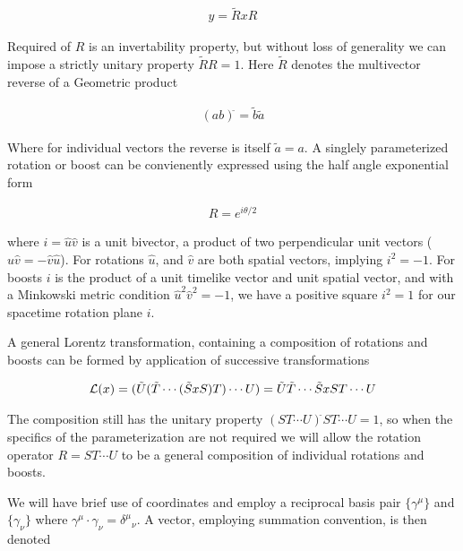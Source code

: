 \begin{align}\label{eqn:rotationGen:foo1}
y = \tilde{R} x R
\end{align}

Required of $R$ is an invertability property, but without loss of generality we can impose a strictly unitary property $\tilde{R} R = 1$.  Here $\tilde{R}$ denotes the multivector reverse of a Geometric product

\begin{align}\label{eqn:rotationGen:foo2}
(a b)^{\tilde{}} = \tilde{b} \tilde{a}
\end{align}

Where for individual vectors the reverse is itself $\tilde{a} = a$.  A singlely parameterized rotation or boost can be convienently expressed using the half angle exponential form

\begin{align}\label{eqn:rotationGen:foo3}
R = e^{i \theta/2}
\end{align}

where $i = \hat{u}\hat{v}$ is a unit bivector, a product of two perpendicular unit vectors ($\hat{u} \hat{v} = - \hat{v} \hat{u}$).  For rotations $\hat{u}$, and $\hat{v}$ are both spatial vectors, implying $i^2 = -1$.  For boosts $i$ is the product of a unit timelike vector and unit spatial vector, and with a Minkowski metric condition $\hat{u}^2 \hat{v}^2 = -1$, we have a positive square $i^2 = 1$ for our spacetime rotation plane $i$.

A general Lorentz transformation, containing a composition of rotations and boosts can be formed by application of successive transformations 

\begin{align}\label{eqn:rotationGen:foo4}
\mathcal{L}(x) = (\tilde{U} (\tilde{T} \cdots (\tilde{S} x S) T )\cdots U) = \tilde{U} \tilde{T} \cdots \tilde{S} x S T \cdots U
\end{align}

The composition still has the unitary property $(S T \cdots U)^{\tilde{}} S T \cdots U = 1$, so when the specifics of the parameterization are not required we will allow the rotation operator $R = S T \cdots U$ to be a general composition of individual rotations and boosts.

We will have brief use of coordinates and employ a reciprocal basis pair $\{\gamma^\mu\}$ and $\{\gamma_\nu\}$ where $\gamma^\mu \cdot \gamma_\nu = {\delta^{\mu}}_\nu$.  A vector, employing summation convention, is then denoted

